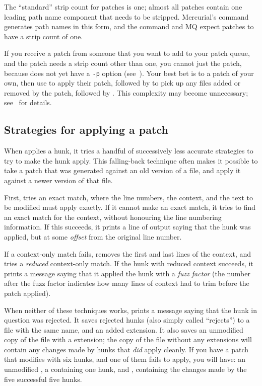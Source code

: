 The ``standard'' strip count for patches is one; almost all patches
contain one leading path name component that needs to be stripped.
Mercurial's  command generates path names in this form,
and the  command and MQ expect patches to have a strip
count of one.

If you receive a patch from someone that you want to add to your patch
queue, and the patch needs a strip count other than one, you cannot
just  the patch, because  does not yet
have a \texttt{-p} option (see~).  Your best bet is to
 a patch of your own, then use 
to apply their patch, followed by  to pick up any
files added or removed by the patch, followed by .
This complexity may become unnecessary; see~ for details.
\subsection{Strategies for applying a patch}

When  applies a hunk, it tries a handful of
successively less accurate strategies to try to make the hunk apply.
This falling-back technique often makes it possible to take a patch
that was generated against an old version of a file, and apply it
against a newer version of that file.

First,  tries an exact match, where the line numbers,
the context, and the text to be modified must apply exactly.  If it
cannot make an exact match, it tries to find an exact match for the
context, without honouring the line numbering information.  If this
succeeds, it prints a line of output saying that the hunk was applied,
but at some \emph{offset} from the original line number.

If a context-only match fails,  removes the first and
last lines of the context, and tries a \emph{reduced} context-only
match.  If the hunk with reduced context succeeds, it prints a message
saying that it applied the hunk with a \emph{fuzz factor} (the number
after the fuzz factor indicates how many lines of context
 had to trim before the patch applied).

When neither of these techniques works,  prints a
message saying that the hunk in question was rejected.  It saves
rejected hunks (also simply called ``rejects'') to a file with the
same name, and an added  extension.  It also saves an
unmodified copy of the file with a  extension; the
copy of the file without any extensions will contain any changes made
by hunks that \emph{did} apply cleanly.  If you have a patch that
modifies  with six hunks, and one of them fails to
apply, you will have: an unmodified , a
 containing one hunk, and , containing
the changes made by the five successful five hunks.

